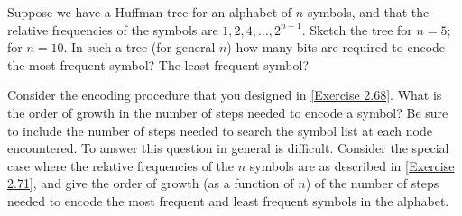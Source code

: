 \begin{exercise}
	\label{Exercise 2.71}
	Suppose we have a Huffman tree for an alphabet of \( n \) symbols, and that the relative frequencies of the symbols are \( 1, 2, 4, \dotsc, 2^{n-1} \).
	Sketch the tree for \( n = 5 \);
	for \( n = 10 \).
	In such a tree (for general \( n \)) how many bits are required to encode the most frequent symbol?
	The least frequent symbol?
\end{exercise}



\begin{exercise}
	\label{Exercise 2.72}
	Consider the encoding procedure that you designed in \cref{Exercise 2.68}.
	What is the order of growth in the number of steps needed to encode a symbol?
	Be sure to include the number of steps needed to search the symbol list at each node encountered.
	To answer this question in general is difficult.
	Consider the special case where the relative frequencies of the \( n \) symbols are as described in \cref{Exercise 2.71}, and give the order of growth (as a function of \( n \)) of the number of steps needed to encode the most frequent and least frequent symbols in the alphabet.
\end{exercise}
